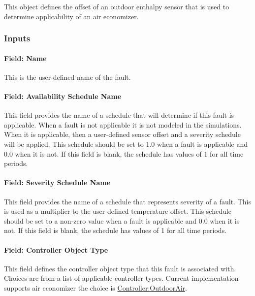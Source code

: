 This object defines the offset of an outdoor enthalpy sensor that is used to determine applicability of an air economizer.

\subsubsection{Inputs}\label{inputs-2-024}

\paragraph{Field: Name}\label{field-name-2-023}

This is the user-defined name of the fault.

\paragraph{Field: Availability Schedule Name}\label{field-availability-schedule-name-2-005}

This field provides the name of a schedule that will determine if this fault is applicable. When a fault is not applicable it is not modeled in the simulations. When it is applicable, then a user-defined sensor offset and a severity schedule will be applied. This schedule should be set to 1.0 when a fault is applicable and 0.0 when it is not. If this field is blank, the schedule has values of 1 for all time periods.

\paragraph{Field: Severity Schedule Name}\label{field-severity-schedule-name-2}

This field provides the name of a schedule that represents severity of a fault. This is used as a multiplier to the user-defined temperature offset. This schedule should be set to a non-zero value when a fault is applicable and 0.0 when it is not. If this field is blank, the schedule has values of 1 for all time periods.

\paragraph{Field: Controller Object Type}\label{field-controller-object-type-2}

This field defines the controller object type that this fault is associated with. Choices are from a list of applicable controller types. Current implementation supports air economizer the choice is \hyperref[controlleroutdoorair]{Controller:OutdoorAir}.

